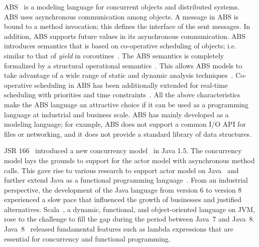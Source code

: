ABS~\cite{johnsen2012abs,hahnlehjlssw11} is a modeling language for concurrent objects and distributed systems.
ABS uses asynchronous communication among objects.
A message in ABS is bound to a method invocation;
this defines the interface of the sent messages.
In addition, ABS supports future values in its asynchronous communication.
ABS introduces  semantics that is based on co-operative scheduling of objects; 
i.e. similar to that of \emph{yield} in coroutines~\cite{creol:broch:owe}.
The ABS semantics is completely formalized by a structural operational semantics~\cite{plotkin:sos,abs:2012}.
This allows ABS models to take advantage of a wide range of static and dynamic analysis techniques~\cite{DBLP:journals/sttt/WongBBGGHMS15,DBLP:conf/cade/DinBH15,DBLP:conf/ifm/GiachinoGLLW13,DBLP:conf/tacas/AlbertAFGGMPR14}.
% 
Co-operative scheduling in ABS has been additionally extended for real-time scheduling with priorities and time constraints~\cite{bjork2013:rtabs,johnsen2012modeling}.
All the above characteristics make the ABS language an attractive choice if it
can be used as a programming language at industrial and business scale.
ABS has mainly developed as a modeling language;
for example, ABS does not support a common I/O API for files or networking,
and it does not provide a standard library of data structures.

JSR 166~\cite{jsr166} introduced a new concurrency model~\cite{DBLP:conf/java/Lea00} in Java 1.5.
The concurrency model lays the grounds to support for the actor model with asynchronous method calls.
This gave rise to various research to support actor model on Java~\cite{actor_frameworks_jvm:agha} and further extend Java as a functional programming language~\cite{odersky1997pizza,henkel2003discovering,nystrom2003polyglot,bracha1998making}.
From an industrial perspective, the development of the Java language from version 6 to version 8 experienced a slow pace that influenced the growth of businesses and justified alternatives.
Scala~\cite{odersky2004scala}, a dynamic, functional, and object-oriented language on JVM, rose to the challenge to fill the gap during the period between Java~7 and Java~8.
Java~8~\cite{jls8} released fundamental features such as lambda expressions that are essential for concurrency and functional programming.

